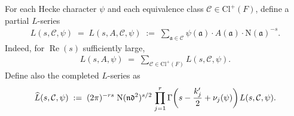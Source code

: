 \documentclass[11pt]{amsart}
\theoremstyle{remark}
\newcommand\cl[1]{\mathcal{#1}}
\newcommand\fr[1]{\mathfrak{#1}}
\newcommand\wh[1]{\widehat{#1}}
\newcommand{\eq}{\;=\;}
\newcommand{\deq}{\;:=\;}
\def\thin{{\hskip 1pt}}
\newcommand{\N}{\mathrm{N}}
\newcommand{\Cl}{\mathrm{Cl}}
\renewcommand{\Re}{\operatorname{Re}}
\begin{document}
For each Hecke character $\psi$ and each equivalence class $\cl{C}\in\Cl^+(F)$, define a partial $L$-series
\begin{align*}
    L(s,\cl{C},\psi)\eq L(s,A,\cl{C},\psi)\deq\sum_{\fr{a}\in\cl{C}}\psi(\fr{a})\cdot A(\fr{a})\cdot\N(\fr{a})^{-s}.
\end{align*}
Indeed, for $\Re(s)$ sufficiently large,
\begin{align*}
    L(s,A,\psi)\eq\sum_{\cl{C}\in\Cl^+(F)}L(s,\cl{C},\psi).
\end{align*}
Define also the completed $L$-series as
\begin{align}
\label{completedpartiallseries}
    \wh{L}(s,\cl{C},\psi)\deq(2\pi)^{-rs}\; \N(\fr{n}\fr{d}^2)^{s/2}\thin\prod_{j=1}^r\Gamma\bigg(s-\frac{k_j^\prime}{2}+\nu_j(\psi)\bigg)\thin L(s,\cl{C},\psi).
\end{align}
\end{document}

